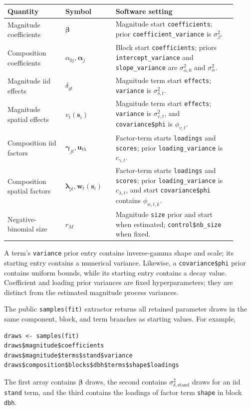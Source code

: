 \documentclass[11pt]{article}
\newcommand{\balpha}{\bm{\alpha}}
\newcommand{\bbeta}{\bm{\beta}}
\newcommand{\bgamma}{\bm{\gamma}}
\newcommand{\blambda}{\bm{\lambda}}
\newcommand{\bu}{\bm{u}}
\newcommand{\bw}{\bm{w}}
\newcommand{\bs}{\bm{s}}
\begin{document}
\begin{center}
\small
\begin{tabular}{>{\raggedright\arraybackslash}p{0.23\linewidth}>{\raggedright\arraybackslash}p{0.20\linewidth}>{\raggedright\arraybackslash}p{0.48\linewidth}}
\toprule
Quantity & Symbol & Software setting \\
\midrule
Magnitude coefficients & \(\bbeta\) &
  Magnitude start \texttt{coefficients}; prior \texttt{coefficient\_variance}
  is \(\sigma_\beta^2\). \\
Composition coefficients & \(\alpha_{0j},\balpha_j\) &
  Block start \texttt{coefficients}; priors \texttt{intercept\_variance}
  and \texttt{slope\_variance} are \(\sigma_{\alpha,0}^2\) and
  \(\sigma_\alpha^2\). \\
Magnitude iid effects & \(\delta_{gt}\) &
  Magnitude term start \texttt{effects}; \texttt{variance} is
  \(\sigma_{\delta,t}^2\). \\
Magnitude spatial effects & \(v_t(\bs_i)\) &
  Magnitude term start \texttt{effects}; \texttt{variance} is
  \(\sigma_{v,t}^2\), and \texttt{covariance\$phi} is \(\phi_{v,t}\). \\
Composition iid factors & \(\bgamma_{jt},\bu_{th}\) &
  Factor-term starts \texttt{loadings} and \texttt{scores};
  prior \texttt{loading\_variance} is \(c_{\gamma,t}\). \\
Composition spatial factors & \(\blambda_{jt},\bw_t(\bs_i)\) &
  Factor-term starts \texttt{loadings} and \texttt{scores};
  prior \texttt{loading\_variance} is \(c_{\lambda,t}\), and
  start \texttt{covariance\$phi} contains \(\phi_{w,t,k}\). \\
Negative-binomial size & \(r_M\) &
  Magnitude \texttt{size} prior and start when estimated;
  \texttt{control\$nb\_size} when fixed. \\
\bottomrule
\end{tabular}
\end{center}

A term's \texttt{variance} prior entry contains inverse-gamma shape and scale;
its starting entry contains a numerical variance. Likewise, a \texttt{covariance\$phi}
prior contains uniform bounds, while its starting entry contains a decay
value. Coefficient and loading prior variances are fixed hyperparameters;
they are distinct from the estimated magnitude process variances.

The public \texttt{samples(fit)} extractor returns all retained
parameter draws in the same component, block, and term branches as starting
values. For example,
\begin{verbatim}
draws <- samples(fit)
draws$magnitude$coefficients
draws$magnitude$terms$stand$variance
draws$composition$blocks$dbh$terms$shape$loadings
\end{verbatim}
The first array contains \(\bbeta\) draws, the second contains
\(\sigma_{\delta,\mathrm{stand}}^2\) draws for an iid \texttt{stand} term,
and the third contains the loadings of factor term \texttt{shape} in block
\texttt{dbh}.
\end{document}

